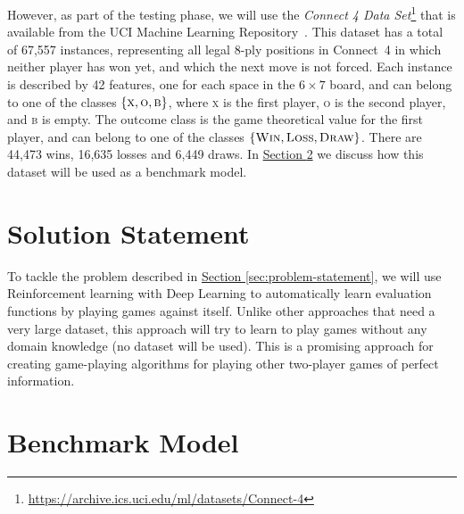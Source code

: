 \documentclass{article}
\begin{document}
However, as part of the testing phase, we will use the \emph{Connect 4 Data
Set}\footnote{\url{https://archive.ics.uci.edu/ml/datasets/Connect-4}} that is available from the
UCI Machine Learning Repository~\citep{Hettich1998UCI}. This dataset has a total of 67,557
instances, representing all legal 8-ply positions in \mbox{Connect 4} in which neither player has
won yet, and which the next move is not forced. Each instance is described by 42 features, one for
each space in the $6 \times 7$ board, and can belong to one of the classes $\{\textsc{x},
\textsc{o}, \textsc{b}\}$, where \textsc{x} is the first player, \textsc{o} is the second player,
and \textsc{b} is empty. The outcome class is the game theoretical value for the first player, and
can belong to one of the classes $\{\textsc{Win}, \textsc{Loss}, \textsc{Draw}\}$. There are 44,473
wins, 16,635 losses and 6,449 draws. In \hyperref[sec:benchmark]{Section \ref*{sec:benchmark}} we
discuss how this dataset will be used as a benchmark model.

\section{Solution Statement}

To tackle the problem described in \hyperref[sec:problem-statement]{Section
\ref*{sec:problem-statement}}, we will use Reinforcement learning with Deep Learning to
automatically learn evaluation functions by playing games against itself. Unlike other approaches
that need a very large dataset, this approach will try to learn to play games without any domain
knowledge (no dataset will be used). This is a promising approach for creating game-playing
algorithms for playing other two-player games of perfect information.

\section{Benchmark Model}
\label{sec:benchmark}
\end{document}
